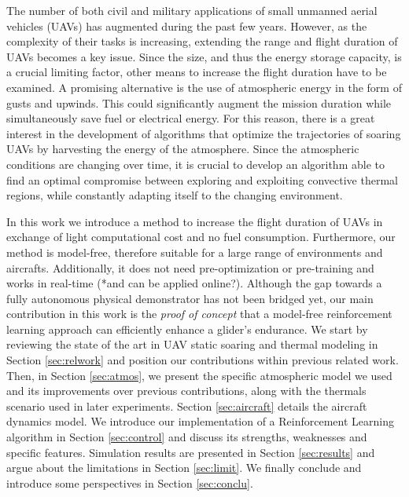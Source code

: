 \documentclass[a4paper, 10pt, conference]{ieeeconf}
\begin{document}
The number of both civil and military applications of small unmanned aerial vehicles (UAVs) has augmented during the past few years. However, as the complexity of their tasks is increasing, extending the range and flight duration of UAVs becomes a key issue. Since the size, and thus the energy storage capacity, is a crucial limiting factor, other means to increase the flight duration have to be examined. A promising alternative is the use of atmospheric energy in the form of gusts and upwinds. This could significantly augment the mission duration while simultaneously {\color{red}save} fuel or electrical energy. For this reason, there is a great interest in the development of algorithms that optimize the trajectories of soaring UAVs by harvesting the energy of the atmosphere. Since the atmospheric conditions are changing over time, it is crucial to develop an algorithm able to find an optimal compromise between exploring and exploiting convective thermal regions, while constantly adapting itself to the changing environment.

In this work we introduce a method to increase the flight duration of UAVs in exchange of light computational cost and no fuel consumption. Furthermore, our method is model-free, therefore suitable for a large range of environments and aircrafts. Additionally, it does not need pre-optimization or pre-training and works in real-time {\color{red}(*and can be applied online?)}. Although the gap towards a fully autonomous physical demonstrator has not been bridged yet, our main contribution in this work is the \emph{proof of concept} that a model-free reinforcement learning approach can efficiently enhance a glider's endurance.
We start by reviewing the state of the art in UAV static soaring and thermal modeling in Section \ref{sec:relwork} and position our contributions within previous related work. Then, in Section \ref{sec:atmos}, we present the specific atmospheric model we used and its improvements over previous contributions, along with the thermals scenario used in later experiments. Section \ref{sec:aircraft} details the aircraft dynamics model. We introduce our implementation of a Reinforcement Learning algorithm in Section \ref{sec:control} and discuss its strengths, weaknesses and specific features. Simulation results are presented in Section \ref{sec:results} {\color{red}and argue about the limitations in Section \ref{sec:limit}}. We finally conclude and introduce some perspectives in Section \ref{sec:conclu}.
\end{document}
